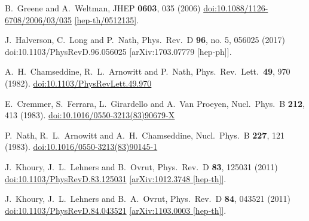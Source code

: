 \documentclass[12pt]{article}
\begin{document}
\begin{thebibliography}{99}
  B.~Greene and A.~Weltman,
  JHEP {\bf 0603}, 035 (2006)
  \href{https://dx.doi.org/10.1088/1126-6708/2006/03/035}{doi:10.1088/1126-6708/2006/03/035}
  \href{https://arxiv.org/abs/hep-th/0512135}{[hep-th/0512135]}.


  J.~Halverson, C.~Long and P.~Nath,
  Phys.\ Rev.\ D {\bf 96}, no. 5, 056025 (2017)
  doi:10.1103/PhysRevD.96.056025
  [arXiv:1703.07779 [hep-ph]].



  A.~H.~Chamseddine, R.~L.~Arnowitt and P.~Nath,
  Phys.\ Rev.\ Lett.\  {\bf 49}, 970 (1982).
  \href{https://dx.doi.org/10.1103/PhysRevLett.49.970}{doi:10.1103/PhysRevLett.49.970}

  E.~Cremmer, S.~Ferrara, L.~Girardello and A.~Van Proeyen,
  Nucl.\ Phys.\ B {\bf 212}, 413 (1983).
  \href{https://dx.doi.org/10.1016/0550-3213(83)90679-X}{doi:10.1016/0550-3213(83)90679-X}

  P.~Nath, R.~L.~Arnowitt and A.~H.~Chamseddine,
  Nucl.\ Phys.\ B {\bf 227}, 121 (1983).
  \href{https://dx.doi.org/10.1016/0550-3213(83)90145-1}{doi:10.1016/0550-3213(83)90145-1}

  J.~Khoury, J.~L.~Lehners and B.~Ovrut,
  Phys.\ Rev.\ D {\bf 83}, 125031 (2011)
  \href{https://dx.doi.org/10.1103/PhysRevD.83.125031}{doi:10.1103/PhysRevD.83.125031}
  \href{https://arxiv.org/abs/1012.3748}{[arXiv:1012.3748 [hep-th]]}.

  J.~Khoury, J.~L.~Lehners and B.~A.~Ovrut,
  Phys.\ Rev.\ D {\bf 84}, 043521 (2011)
  \href{https://dx.doi.org/10.1103/PhysRevD.84.043521}{doi:10.1103/PhysRevD.84.043521}
  \href{https://arxiv.org/abs/1103.0003}{[arXiv:1103.0003 [hep-th]]}.


\end{thebibliography}
\end{document}
